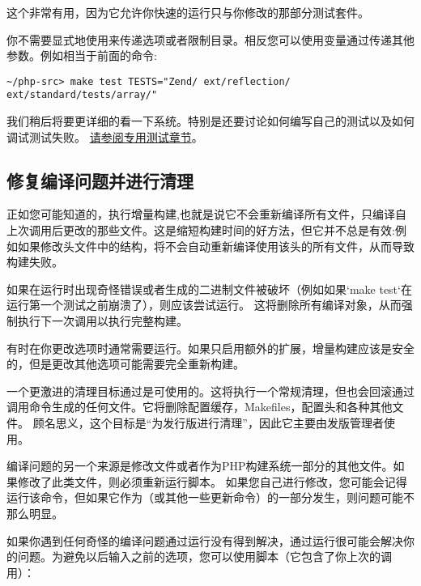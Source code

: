 这个非常有用，因为它允许你快速的运行只与你修改的那部分测试套件。

你不需要显式地使用来传递选项或者限制目录。相反您可以使用变量通过传递其他参数。例如相当于前面的命令:
\begin{lstlisting}[language=shell]
~/php-src> make test TESTS="Zend/ ext/reflection/ ext/standard/tests/array/"
\end{lstlisting}

我们稍后将要更详细的看一下系统。特别是还要讨论如何编写自己的测试以及如何调试测试失败。 \href{http://www.phpinternalsbook.com/tests/introduction.html}{请参阅专用测试章节}。

\subsection{修复编译问题并进行清理}

正如您可能知道的，执行增量构建,也就是说它不会重新编译所有文件，只编译自上次调用后更改的那些文件。这是缩短构建时间的好方法，但它并不总是有效:例如如果修改头文件中的结构，将不会自动重新编译使用该头的所有文件，从而导致构建失败。

如果在运行时出现奇怪错误或者生成的二进制文件被破坏（例如如果`make test`在运行第一个测试之前崩溃了），则应该尝试运行。 这将删除所有编译对象，从而强制执行下一次调用以执行完整构建。

有时在你更改选项时通常需要运行。如果只启用额外的扩展，增量构建应该是安全的，但是更改其他选项可能需要完全重新构建。

一个更激进的清理目标通过是可使用的。这将执行一个常规清理，但也会回滚通过调用命令生成的任何文件。它将删除配置缓存，Makefiles，配置头和各种其他文件。 顾名思义，这个目标是“为发行版进行清理”，因此它主要由发版管理者使用。

编译问题的另一个来源是修改文件或者作为PHP构建系统一部分的其他文件。如果修改了此类文件，则必须重新运行脚本。 如果您自己进行修改，您可能会记得运行该命令，但如果它作为（或其他一些更新命令）的一部分发生，则问题可能不那么明显。

如果你遇到任何奇怪的编译问题通过运行没有得到解决，通过运行很可能会解决你的问题。为避免以后输入之前的选项，您可以使用脚本（它包含了你上次的调用）：

